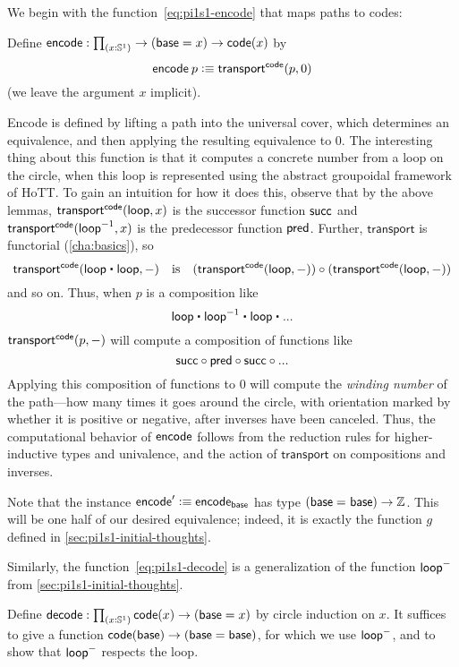 We begin with the function~\eqref{eq:pi1s1-encode} that maps paths to codes:
\begin{defn}
Define $\encode : \prd{x : \Sn ^1} \rightarrow (\base=x) \rightarrow  \code(x)$ by 
\[
\mathsf{encode} \: p \vcentcolon\equiv \mathsf{transport}^{\mathsf{code}}(p,0)
\]
(we leave the argument $x$ implicit).  
\end{defn}
Encode is defined by lifting a path into the universal cover, which
determines an equivalence, and then applying the resulting equivalence
to $0$.  
The interesting thing about this function is that it computes a concrete
number from a loop on the circle, when this loop is represented using
the abstract groupoidal framework of HoTT.  To gain an
intuition for how it does this, observe that by the above lemmas,
$\mathsf{transport}^{\mathsf{code}}(\mathsf{loop},x)$ is the successor function $\mathsf{succ}$ and $\mathsf{transport}^{\mathsf{code}}(\mathord{{\mathsf{loop}}^{-1}},x)$ is the predecessor function $\mathsf{pred}$.
Further, $\mathsf{transport}$ is functorial (\autoref{cha:basics}), so
\[\transfib{\code} {\lloop \ct \lloop}{-}
\quad\text{is}\quad
(\transfib \code \lloop-) \circ (\transfib \code \lloop-)\]
and so on.
Thus, when $p$ is a composition like 
\[
\lloop \ct \opp \lloop \ct \lloop \ct ...
\]
$\mathsf{transport}^{\mathsf{code}}(p,-)$ will compute a composition of functions like
\[
\mathsf{succ} \circ \mathsf{pred} \circ \mathsf{succ} \circ ... 
\]
Applying this composition of functions to 0 will compute the
\emph{winding number} of the path---how many times it goes around the
circle, with orientation marked by whether it is positive or negative,
after inverses have been canceled.  Thus, the computational behavior of
$\mathsf{encode}$ follows from the reduction rules for higher-inductive types and
univalence, and the action of $\mathsf{transport}$ on compositions and inverses.

Note that the instance $\mathsf{encode}' \vcentcolon\equiv \mathsf{encode}_{\mathsf{base}}$ has type 
$(\mathsf{base} =_{} \mathsf{base}) \rightarrow \mathbb{Z}$.
This will be one half of our desired equivalence; indeed, it is exactly the function $g$ defined in \autoref{sec:pi1s1-initial-thoughts}.

Similarly, the function~\eqref{eq:pi1s1-decode} is a generalization of the function $\mathsf{loop}^-$ from \autoref{sec:pi1s1-initial-thoughts}.

\begin{defn}\label{thm:pi1s1-decode}
Define $\decode : \prd{x : \Sn ^1}\code(x) \rightarrow (\base=x)$ by 
circle induction on $x$.  It suffices to give a function 
${\mathsf{code}(\mathsf{base}) \rightarrow (\mathsf{base}=\mathsf{base})}$, for which we use $\mathsf{loop}^-$, and 
to show that $\mathsf{loop}^-$ respects the loop.  
\end{defn}

